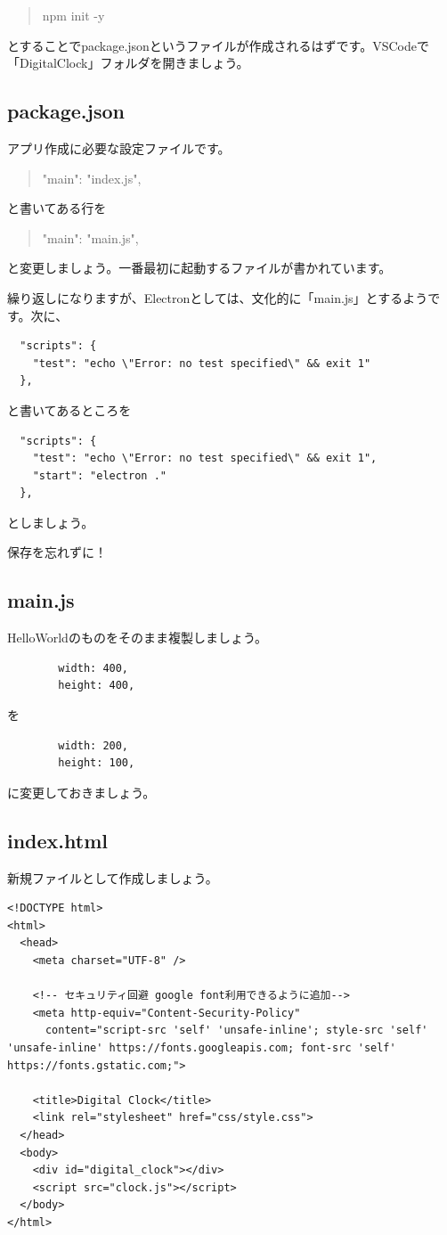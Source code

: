 \documentclass[mingoth,11pt,a4j,uplatex]{jsarticle}
\begin{document}
\begin{quote}
npm init -y
\end{quote}
とすることでpackage.jsonというファイルが作成されるはずです。VSCodeで「DigitalClock」フォルダを開きましょう。

\subsection{package.json}
アプリ作成に必要な設定ファイルです。
\begin{quote}
  "main": "index.js",
\end{quote}
と書いてある行を
\begin{quote}
  "main": "main.js",
\end{quote}
と変更しましょう。一番最初に起動するファイルが書かれています。

繰り返しになりますが、Electronとしては、文化的に「main.js」とするようです。次に、

\begin{verbatim}
  "scripts": {
    "test": "echo \"Error: no test specified\" && exit 1"
  },
\end{verbatim}
と書いてあるところを
\begin{verbatim}
  "scripts": {
    "test": "echo \"Error: no test specified\" && exit 1",
    "start": "electron ."
  },
\end{verbatim}
としましょう。

保存を忘れずに！

\subsection{main.js}
HelloWorldのものをそのまま複製しましょう。

\begin{verbatim}
        width: 400,
        height: 400,
\end{verbatim}
を
\begin{verbatim}
        width: 200,
        height: 100,
\end{verbatim}
に変更しておきましょう。
\subsection{index.html}
新規ファイルとして作成しましょう。
\begin{lstlisting}[caption=DigitalClock：index.html]
<!DOCTYPE html>
<html>
  <head>
    <meta charset="UTF-8" />

    <!-- セキュリティ回避 google font利用できるように追加-->
    <meta http-equiv="Content-Security-Policy" 
      content="script-src 'self' 'unsafe-inline'; style-src 'self' 'unsafe-inline' https://fonts.googleapis.com; font-src 'self' https://fonts.gstatic.com;">

    <title>Digital Clock</title>
    <link rel="stylesheet" href="css/style.css">
  </head>
  <body>
    <div id="digital_clock"></div>
    <script src="clock.js"></script>
  </body>
</html>
\end{lstlisting}
\end{document}
